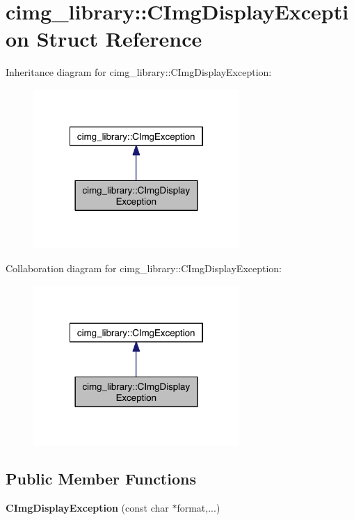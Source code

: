 \hypertarget{structcimg__library_1_1_c_img_display_exception}{\section{cimg\-\_\-library\-:\-:C\-Img\-Display\-Exception Struct Reference}
\label{structcimg__library_1_1_c_img_display_exception}
}


Inheritance diagram for cimg\-\_\-library\-:\-:C\-Img\-Display\-Exception\-:
\nopagebreak
\begin{figure}[H]
\begin{center}
\leavevmode
\includegraphics[width=222pt]{structcimg__library_1_1_c_img_display_exception__inherit__graph}
\end{center}
\end{figure}


Collaboration diagram for cimg\-\_\-library\-:\-:C\-Img\-Display\-Exception\-:
\nopagebreak
\begin{figure}[H]
\begin{center}
\leavevmode
\includegraphics[width=222pt]{structcimg__library_1_1_c_img_display_exception__coll__graph}
\end{center}
\end{figure}
\subsection*{Public Member Functions}
\begin{DoxyCompactItemize}
\item 
\hypertarget{structcimg__library_1_1_c_img_display_exception_a59ce83ec2cc519ec42391a51512e257c}{{\bfseries C\-Img\-Display\-Exception} (const char $\ast$format,...)}\label{structcimg__library_1_1_c_img_display_exception_a59ce83ec2cc519ec42391a51512e257c}

\end{DoxyCompactItemize}
